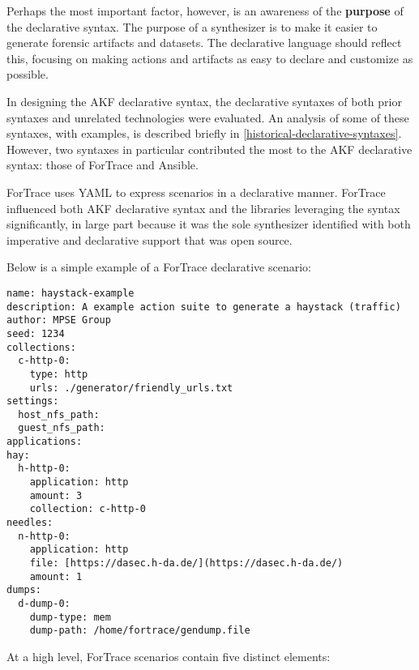 Perhaps the most important factor, however, is an awareness of the
\textbf{purpose} of the declarative syntax. The purpose of a synthesizer
is to make it easier to generate forensic artifacts and datasets. The
declarative language should reflect this, focusing on making actions and
artifacts as easy to declare and customize as possible.

In designing the AKF declarative syntax, the declarative syntaxes of
both prior syntaxes and unrelated technologies were evaluated. An
analysis of some of these syntaxes, with examples, is described briefly
in \autoref{historical-declarative-syntaxes}.
However, two syntaxes in particular contributed the most to the AKF
declarative syntax: those of ForTrace and Ansible.

ForTrace uses YAML to express scenarios in a declarative manner.
ForTrace influenced both AKF declarative syntax and the libraries
leveraging the syntax significantly, in large part because it was the
sole synthesizer identified with both imperative and declarative support
that was open source.

Below is a simple example of a ForTrace declarative scenario:

\begin{lstlisting}
name: haystack-example
description: A example action suite to generate a haystack (traffic)
author: MPSE Group
seed: 1234
collections:
  c-http-0:
    type: http
    urls: ./generator/friendly_urls.txt
settings:
  host_nfs_path:
  guest_nfs_path:
applications:
hay:
  h-http-0:
    application: http
    amount: 3
    collection: c-http-0
needles:
  n-http-0:
    application: http
    file: [https://dasec.h-da.de/](https://dasec.h-da.de/)
    amount: 1
dumps:
  d-dump-0:
    dump-type: mem
    dump-path: /home/fortrace/gendump.file
\end{lstlisting}

At a high level, ForTrace scenarios contain five distinct elements:


